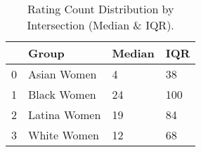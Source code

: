 \begin{table}[htbp]
\centering
\caption{Rating Count Distribution by Intersection (Median & IQR).}
\label{tab:eda_rating_count_by_group}
\begin{tabular}{llll}
\toprule
 & Group & Median & IQR \\
\midrule
0 & Asian Women & 4 & 38 \\
1 & Black Women & 24 & 100 \\
2 & Latina Women & 19 & 84 \\
3 & White Women & 12 & 68 \\
\bottomrule
\end{tabular}

\end{table}